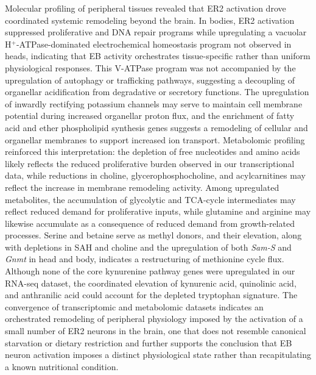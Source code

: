 Molecular profiling of peripheral tissues revealed that ER2 activation drove coordinated systemic remodeling beyond the brain. 
In bodies, ER2 activation suppressed proliferative and DNA repair programs while upregulating a vacuolar H$^{+}$-ATPase-dominated electrochemical homeostasis program not observed in heads, indicating that EB activity orchestrates tissue-specific rather than uniform physiological responses. 
This V-ATPase program was not accompanied by the upregulation of autophagy or trafficking pathways, suggesting a decoupling of organellar acidification from degradative or secretory functions. 
The upregulation of inwardly rectifying potassium channels may serve to maintain cell membrane potential during increased organellar proton flux, and the enrichment of fatty acid and ether phospholipid synthesis genes suggests a remodeling of cellular and organellar membranes to support increased ion transport. 
Metabolomic profiling reinforced this interpretation: the depletion of free nucleotides and amino acids likely reflects the reduced proliferative burden observed in our transcriptional data, while reductions in choline, glycerophosphocholine, and acylcarnitines may reflect the increase in membrane remodeling activity. 
Among upregulated metabolites, the accumulation of glycolytic and TCA-cycle intermediates may reflect reduced demand for proliferative inputs, while glutamine and arginine may likewise accumulate as a consequence of reduced demand from growth-related processes. 
Serine and betaine serve as methyl donors, and their elevation, along with depletions in SAH and choline and the upregulation of both \textit{Sam-S} and \textit{Gnmt} in head and body, indicates a restructuring of methionine cycle flux. 
Although none of the core kynurenine pathway genes were upregulated in our RNA-seq dataset, the coordinated elevation of kynurenic acid, quinolinic acid, and anthranilic acid could account for the depleted tryptophan signature. 
The convergence of transcriptomic and metabolomic datasets indicates an orchestrated remodeling of peripheral physiology imposed by the activation of a small number of ER2 neurons in the brain, one that does not resemble canonical starvation or dietary restriction and further supports the conclusion that EB neuron activation imposes a distinct physiological state rather than recapitulating a known nutritional condition.


